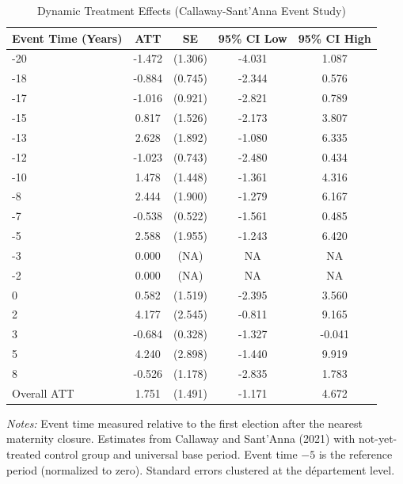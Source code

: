 \begin{table}[htbp]
\centering
\caption{Dynamic Treatment Effects (Callaway-Sant'Anna Event Study)}
\label{tab:event_study}
\begin{tabular}{lcccc}
\toprule
Event Time (Years) & ATT & SE & 95\% CI Low & 95\% CI High \\
\midrule
-20 & -1.472 & (1.306) & -4.031 & 1.087 \\
-18 & -0.884 & (0.745) & -2.344 & 0.576 \\
-17 & -1.016 & (0.921) & -2.821 & 0.789 \\
-15 & 0.817 & (1.526) & -2.173 & 3.807 \\
-13 & 2.628 & (1.892) & -1.080 & 6.335 \\
-12 & -1.023 & (0.743) & -2.480 & 0.434 \\
-10 & 1.478 & (1.448) & -1.361 & 4.316 \\
-8 & 2.444 & (1.900) & -1.279 & 6.167 \\
-7 & -0.538 & (0.522) & -1.561 & 0.485 \\
-5 & 2.588 & (1.955) & -1.243 & 6.420 \\
-3 & 0.000 & (NA) & NA & NA \\
-2 & 0.000 & (NA) & NA & NA \\
0 & 0.582 & (1.519) & -2.395 & 3.560 \\
2 & 4.177 & (2.545) & -0.811 & 9.165 \\
3 & -0.684 & (0.328) & -1.327 & -0.041 \\
5 & 4.240 & (2.898) & -1.440 & 9.919 \\
8 & -0.526 & (1.178) & -2.835 & 1.783 \\
\midrule
Overall ATT & 1.751 & (1.491) & -1.171 & 4.672 \\
\bottomrule
\end{tabular}
\begin{tablenotes}[flushleft]
\small
\item \textit{Notes:} Event time measured relative to the first election after the nearest maternity closure. Estimates from Callaway and Sant'Anna (2021) with not-yet-treated control group and universal base period. Event time $-5$ is the reference period (normalized to zero). Standard errors clustered at the d\'{e}partement level.
\end{tablenotes}
\end{table}

